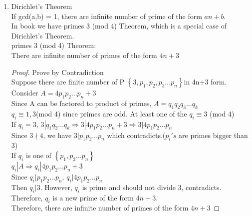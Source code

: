 \documentclass[10pt]{article}
\begin{document}
\begin{multicols}{2}
\begin{enumerate}
\begin{enumerate}
		Then $ax_0 \equiv c$(mod m). We want to find all x.\\
		Then $ax_0 = ax$ (mod m)\\
		$m | a(x-x_0)\Rightarrow \frac{m}{gcd(m,a)}|\frac{a}{gcd(m,a)}(x-x_0)$\\
		$gcd(\frac{m}{gcd(m,a)},\frac{a}{gcd(m,a)}) = 1\Rightarrow \frac{m}{gcd(m,a)}|x-x_0$\\
		$\Rightarrow x = x_0 + k\frac{m}{gcd(m,a)}$
		\item $x \equiv b$ (mod m), $x \equiv c$ (mod m), gcd(m,n) = 1\\
		Use Chinese Remainder Theorm's proof
	\end{enumerate}
	
	\item Dirichlet's Theorem\\
	If gcd(a,b) = 1, there are infinite number of prime of the form $an+b$.\\
	In book we have primes 3 (mod 4) Theorem, which is a special case of Dirichlet's Theorem.\\
	primes 3 (mod 4) Theorem:\\ There are infinite number of primes of the form $4n+3$
	\begin{proof}
		Prove by Contradiction\\
		Suppose there are finite number of P $\left\{3, p_1, p_2, p_3 ... p_n\right\}$in 4n+3 form.\\
		Consider $A = 4p_1p_2 \dots p_n + 3$\\
		Since A can be factored to product of primes, $A = q_1q_2q_3\dots q_k$\\
		$q_i \equiv 1,3$(mod 4) since primes are odd. At least one of the $q_i \equiv 3$ (mod 4)\\
		If $q_i = 3$, $3| q_1q_2\dots q_k \Rightarrow 3|4p_1p_2\dots p_n + 3 \Rightarrow 3|4p_1p_2\dots p_n $ \\
		Since $3 \nmid 4$, we have $3|p_1p_2 \dots p_n$ which contradicts.($p_i's$ are primes bigger than 3)\\
		If $q_i$ is one of $\left\{p_1,p_2\dots p_n\right\}$\\
		$q_i | A\Rightarrow q_i|4p_1p_2 \dots p_n + 3$\\
		Since $q_i | p_1p_2\dots p_n$, $q_i | 4p_1p_2 \dots p_n$\\
		Then $q_i | 3$. However, $q_i$ is prime and should not divide 3, contradicts.\\
		Therefore, $q_i$ is a new prime of the form $4n+3$.\\
		Therefore, there are infinite number of primes of the form $4n+3$
	\end{proof}


\end{enumerate}
\end{multicols}
\end{document}
